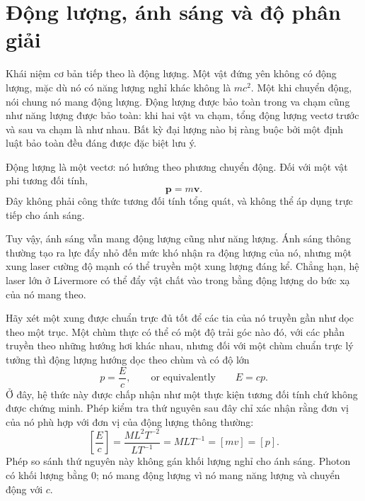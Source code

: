 \begin{classroomqa}
\end{classroomqa}

\section{Động lượng, ánh sáng và độ phân giải}

Khái niệm cơ bản tiếp theo là động lượng. Một vật đứng yên không có động lượng, mặc dù nó có năng lượng nghỉ khác không là \(mc^2\). Một khi chuyển động, nói chung nó mang động lượng. Động lượng được bảo toàn trong va chạm cũng như năng lượng được bảo toàn: khi hai vật va chạm, tổng động lượng vectơ trước và sau va chạm là như nhau. Bất kỳ đại lượng nào bị ràng buộc bởi một định luật bảo toàn đều đáng được đặc biệt lưu ý.

Động lượng là một vectơ: nó hướng theo phương chuyển động. Đối với một vật phi tương đối tính,
\begin{equation}
\mathbf p=m\mathbf v.
\end{equation}
Đây không phải công thức tương đối tính tổng quát, và không thể áp dụng trực tiếp cho ánh sáng.

Tuy vậy, ánh sáng vẫn mang động lượng cũng như năng lượng. Ánh sáng thông thường tạo ra lực đẩy nhỏ đến mức khó nhận ra động lượng của nó, nhưng một xung laser cường độ mạnh có thể truyền một xung lượng đáng kể. Chẳng hạn, hệ laser lớn ở Livermore có thể đẩy vật chất vào trong bằng động lượng do bức xạ của nó mang theo.

Hãy xét một xung được chuẩn trực đủ tốt để các tia của nó truyền gần như dọc theo một trục. Một chùm thực có thể có một độ trải góc nào đó, với các phần truyền theo những hướng hơi khác nhau, nhưng đối với một chùm chuẩn trực lý tưởng thì động lượng hướng dọc theo chùm và có độ lớn
\begin{equation}
p=\frac{E}{c},
\qquad\text{or equivalently}\qquad
E=cp.
\end{equation}
Ở đây, hệ thức này được chấp nhận như một thực kiện tương đối tính chứ không được chứng minh. Phép kiểm tra thứ nguyên sau đây chỉ xác nhận rằng đơn vị của nó phù hợp với đơn vị của động lượng thông thường:
\begin{equation}
\left[\frac{E}{c}\right]
=
\frac{M L^2 T^{-2}}{L T^{-1}}
=
M L T^{-1}
=
[m v]
=
[p].
\end{equation}
Phép so sánh thứ nguyên này không gán khối lượng nghỉ cho ánh sáng. Photon có khối lượng bằng 0; nó mang động lượng vì nó mang năng lượng và chuyển động với \(c\).

